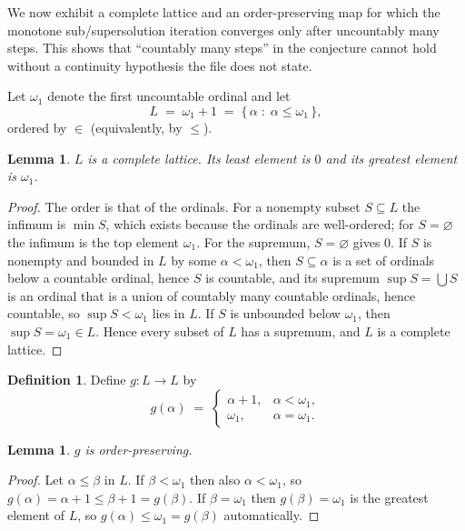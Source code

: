 \documentclass[11pt]{article}
\newtheorem{lemma}[theorem]{Lemma}
\theoremstyle{definition}
\newtheorem{definition}[theorem]{Definition}
\theoremstyle{remark}
\newcommand{\Lc}{L}
\begin{document}
We now exhibit a complete lattice and an order-preserving map for which the
monotone sub/supersolution iteration converges only after uncountably many
steps. This shows that ``countably many steps'' in the conjecture cannot hold
without a continuity hypothesis the file does not state.

Let $\omega_1$ denote the first uncountable ordinal and let
\[
\Lc \;=\; \omega_1+1 \;=\; \{\, \alpha \;:\; \alpha \le \omega_1 \,\},
\]
ordered by $\in$ (equivalently, by $\le$).

\begin{lemma}\label{lem:complete}
$\Lc$ is a complete lattice. Its least element is $0$ and its greatest element
is $\omega_1$.
\end{lemma}

\begin{proof}
The order is that of the ordinals. For a nonempty subset $S\subseteq\Lc$ the
infimum is $\min S$, which exists because the ordinals are well-ordered; for
$S=\varnothing$ the infimum is the top element $\omega_1$. For the supremum,
$S=\varnothing$ gives $0$. If $S$ is nonempty and bounded in $\Lc$ by some
$\alpha<\omega_1$, then $S\subseteq\alpha$ is a set of ordinals below a
countable ordinal, hence $S$ is countable, and its supremum $\sup S=\bigcup S$
is an ordinal that is a union of countably many countable ordinals, hence
countable, so $\sup S<\omega_1$ lies in $\Lc$. If $S$ is unbounded below
$\omega_1$, then $\sup S=\omega_1\in\Lc$. Hence every subset of $\Lc$ has a
supremum, and $\Lc$ is a complete lattice.
\end{proof}

\begin{definition}\label{def:f}
Define $g:\Lc\to\Lc$ by
\[
g(\alpha) \;=\;
\begin{cases}
\alpha+1, & \alpha < \omega_1,\\[2pt]
\omega_1,  & \alpha = \omega_1.
\end{cases}
\]
\end{definition}

\begin{lemma}\label{lem:gmono}
$g$ is order-preserving.
\end{lemma}

\begin{proof}
Let $\alpha\le\beta$ in $\Lc$. If $\beta<\omega_1$ then also
$\alpha<\omega_1$, so $g(\alpha)=\alpha+1\le\beta+1=g(\beta)$. If
$\beta=\omega_1$ then $g(\beta)=\omega_1$ is the greatest element of $\Lc$, so
$g(\alpha)\le\omega_1=g(\beta)$ automatically.
\end{proof}
\end{document}
